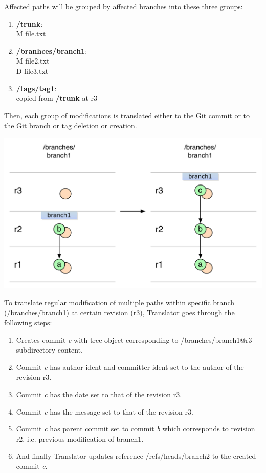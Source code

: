 Affected paths will be grouped by affected branches into these three groups:
\begin{enumerate}
\item \textbf{/trunk}:\\
M file.txt
\item \textbf{/branhces/branch1}:\\
M file2.txt\\
D file3.txt
\item \textbf{/tags/tag1}:\\
  copied from \textbf{/trunk} at r3
\end{enumerate}
Then, each group of modifications is translated either to the Git commit or to
the Git branch or tag deletion or creation. 
\begin{center}
\includegraphics[width=\textwidth]{img/diagrams/single_change_svn_to_git.pdf}%
\label{single_change_svn_to_git}%
\end{center}
To translate regular modification of multiple paths within specific branch (/branches/branch1) at certain revision (r3), 
Translator goes through the following steps: 
\begin{enumerate}
	\compactlist
	\item Creates commit \emph{c} with tree object corresponding to /branches/branch1@r3 subdirectory content.
	\item Commit \emph{c} has author ident and committer ident set to the author of the revision r3.
	\item Commit \emph{c} has the date set to that of the revision r3.
	\item Commit \emph{c} has the message set to that of the revision r3.
	\item Commit \emph{c} has parent commit set to commit \emph{b} which corresponds to revision r2, i.e. previous modification of branch1.
	\item And finally Translator updates reference /refs/heads/branch2 to the created commit \emph{c}.
\end{enumerate}

